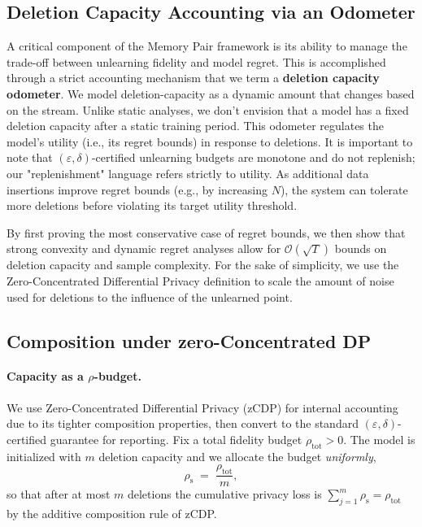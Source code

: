 \documentclass{article}
\theoremstyle{ssltheorem}
\begin{document}
\subsection{Deletion Capacity Accounting via an Odometer}

A critical component of the Memory Pair framework is its ability to manage the trade-off between unlearning fidelity and model regret.
This is accomplished through a strict accounting mechanism that we term a \textbf{deletion capacity odometer}.
We model deletion-capacity as a dynamic amount that changes based on the stream.
Unlike static analyses, we don't envision that a model has a fixed deletion capacity after a static training period.
This odometer regulates the model's utility (i.e., its regret bounds) in response to deletions. It is important to note that $(\varepsilon,\delta)$-certified unlearning budgets are monotone and do not replenish; our "replenishment" language refers strictly to utility. As additional data insertions improve regret bounds (e.g., by increasing $N$), the system can tolerate more deletions before violating its target utility threshold.


By first proving the most conservative case of regret bounds, we then show that strong convexity and dynamic regret analyses allow for $\mathcal{O}(\sqrt{T})$ bounds on deletion capacity and sample complexity.
For the sake of simplicity, we use the Zero-Concentrated Differential Privacy definition to scale the amount of noise used for deletions to the influence of the unlearned point.
\subsection{Composition under zero-Concentrated DP}
\label{subsec:zcdp_composition}

\paragraph{Capacity as a {$\rho$}-budget.}
We use Zero-Concentrated Differential Privacy (zCDP) \cite{Bun_Steinke_2016} for internal accounting due to its tighter composition properties, then convert to the standard $(\varepsilon,\delta)$-certified guarantee for reporting.
Fix a total fidelity budget $\rho_{\text{tot}}>0$. The model is initialized with $m$ deletion capacity and we allocate the budget \emph{uniformly},
$$
  \rho_{\text{s}}\;=\;\frac{\rho_{\text{tot}}}{m},
$$
so that after at most \(m\) deletions the cumulative privacy loss is
$
  \sum_{j=1}^{m}\rho_{\text{s}}
  = \rho_{\text{tot}}
$
by the additive composition rule of zCDP.
\end{document}
